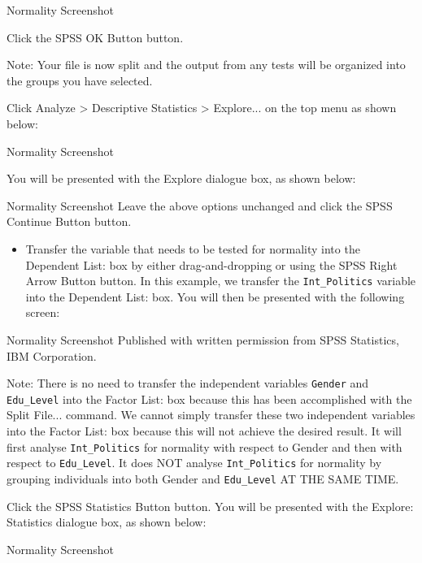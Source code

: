 \documentclass[]{article}
\begin{document}
Normality Screenshot

Click the SPSS OK Button button.

Note: Your file is now split and the output from any tests will be organized into the groups you have selected.

Click Analyze > Descriptive Statistics > Explore... on the top menu as shown below:

Normality Screenshot

You will be presented with the Explore dialogue box, as shown below:

Normality Screenshot
Leave the above options unchanged and click the SPSS Continue Button button.

\begin{itemize}
	\item Transfer the variable that needs to be tested for normality into the Dependent List: box by either drag-and-dropping or using the SPSS Right Arrow Button button. In this example, we transfer the \texttt{Int\_Politics} variable into the Dependent List: box. You will then be presented with the following screen:
\end{itemize}


Normality Screenshot
Published with written permission from SPSS Statistics, IBM Corporation.

\begin{framed}
Note: There is no need to transfer the independent variables \texttt{Gender} and \texttt{Edu\_Level} into the Factor List: box because this has been accomplished with the Split File... command. We cannot simply transfer these two independent variables into the Factor List: box because this will not achieve the desired result. It will first analyse \texttt{Int\_Politics} for normality with respect to Gender and then with respect to \texttt{Edu\_Level}. It does NOT analyse \texttt{Int\_Politics} for normality by grouping individuals into both Gender and \texttt{Edu\_Level} AT THE SAME TIME.
\end{framed}

Click the SPSS Statistics Button button. You will be presented with the Explore: Statistics dialogue box, as shown below:

Normality Screenshot
\end{document}
